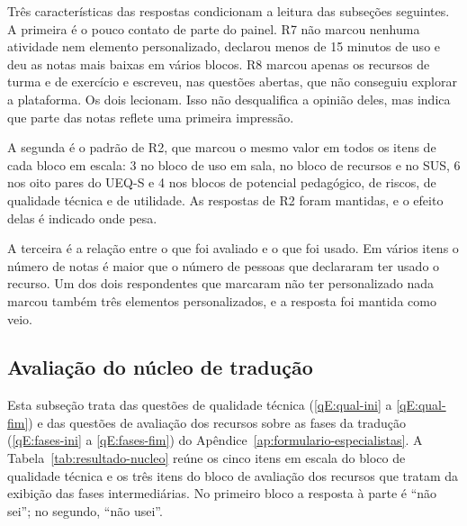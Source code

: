 Três características das respostas condicionam a leitura das subseções seguintes. A primeira é o pouco contato de parte do painel. R7 não marcou nenhuma atividade nem elemento personalizado, declarou menos de 15 minutos de uso e deu as notas mais baixas em vários blocos. R8 marcou apenas os recursos de turma e de exercício e escreveu, nas questões abertas, que não conseguiu explorar a plataforma. Os dois lecionam. Isso não desqualifica a opinião deles, mas indica que parte das notas reflete uma primeira impressão.

A segunda é o padrão de R2, que marcou o mesmo valor em todos os itens de cada bloco em escala: 3 no bloco de uso em sala, no bloco de recursos e no SUS, 6 nos oito pares do UEQ-S e 4 nos blocos de potencial pedagógico, de riscos, de qualidade técnica e de utilidade. As respostas de R2 foram mantidas, e o efeito delas é indicado onde pesa.

A terceira é a relação entre o que foi avaliado e o que foi usado. Em vários itens o número de notas é maior que o número de pessoas que declararam ter usado o recurso. Um dos dois respondentes que marcaram não ter personalizado nada marcou também três elementos personalizados, e a resposta foi mantida como veio.

\subsection{Avaliação do núcleo de tradução}
\label{sec:resultado-nucleo}

Esta subseção trata das questões de qualidade técnica (\ref{qE:qual-ini} a \ref{qE:qual-fim}) e das questões de avaliação dos recursos sobre as fases da tradução (\ref{qE:fases-ini} a \ref{qE:fases-fim}) do Apêndice~\ref{ap:formulario-especialistas}. A Tabela~\ref{tab:resultado-nucleo} reúne os cinco itens em escala do bloco de qualidade técnica e os três itens do bloco de avaliação dos recursos que tratam da exibição das fases intermediárias. No primeiro bloco a resposta à parte é ``não sei''; no segundo, ``não usei''.


